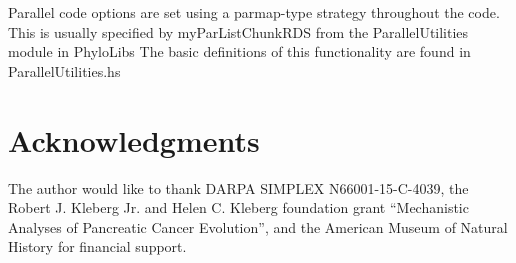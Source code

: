\documentclass[11pt]{article}
\begin{document}
	Parallel code options are set using a parmap-type strategy throughout the code.  This is usually specified by myParListChunkRDS from the ParallelUtilities module in PhyloLibs The basic definitions of this functionality are found in ParallelUtilities.hs
	
	\section*{Acknowledgments}
	The author would like to thank DARPA SIMPLEX N66001-15-C-4039, the  Robert J. Kleberg Jr. and Helen C. Kleberg foundation grant ``Mechanistic Analyses of Pancreatic Cancer Evolution'', and the American Museum of Natural History for financial support.  
	
	\newpage
	
\end{document}
